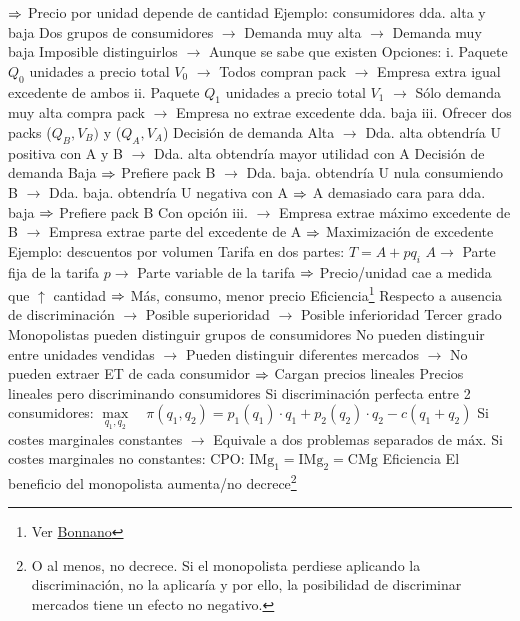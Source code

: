 \documentclass{nuevotema}
\begin{document}
\begin{esquemal}
				\4[] $\Rightarrow$ Precio por unidad depende de cantidad
				\4 Ejemplo: consumidores dda. alta y baja
				\4[] Dos grupos de consumidores
				\4[] $\to$ Demanda muy alta
				\4[] $\to$ Demanda muy baja
				\4[] Imposible distinguirlos
				\4[] $\to$ Aunque se sabe que existen
				\4[] Opciones:
				\4[] i. Paquete $Q_0$ unidades a precio total $V_0$
				\4[] $\to$ Todos compran pack
				\4[] $\to$ Empresa extra igual excedente de ambos
				\4[] ii. Paquete $Q_1$ unidades a precio total $V_1$
				\4[] $\to$ Sólo demanda muy alta compra pack
				\4[] $\to$ Empresa no extrae excedente dda. baja
				\4[] iii. Ofrecer dos packs ($Q_B, V_B)$ y ($Q_A, V_A$)
				\4[] Decisión de demanda Alta
				\4[] $\to$ Dda. alta obtendría U positiva con A y B
				\4[] $\to$ Dda. alta obtendría mayor utilidad con A
				\4[] Decisión de demanda Baja
				\4[] $\Rightarrow$ Prefiere pack B
				\4[] $\to$ Dda. baja. obtendría U nula consumiendo B
				\4[] $\to$ Dda. baja. obtendría U negativa con A
				\4[] $\Rightarrow$ A demasiado cara para dda. baja
				\4[] $\Rightarrow$ Prefiere pack B
				\4[] Con opción iii.
				\4[] $\to$ Empresa extrae máximo excedente de B
				\4[] $\to$ Empresa extrae parte del excedente de A
				\4[] $\Rightarrow$ Maximización de excedente
				\4 Ejemplo: descuentos por volumen
				\4[] Tarifa en dos partes:
				\4[] $T = A + p q_i$
				\4[] $A \to$ Parte fija de la tarifa
				\4[] $p \to$ Parte variable de la tarifa
				\4[] $\Rightarrow$ Precio/unidad cae a medida que $\uparrow$ cantidad
				\4[] $\Rightarrow$ Más, consumo, menor precio
				\4 Eficiencia\footnote{Ver \href{http://faculty.econ.ucdavis.edu/faculty/bonanno/teaching/200C/2nd_degree.pdf}{Bonnano}}
				\4[] Respecto a ausencia de discriminación
				\4[] $\to$ Posible superioridad
				\4[] $\to$ Posible inferioridad
			\3 Tercer grado
				\4 Monopolistas pueden distinguir grupos de consumidores
				\4[] No pueden distinguir entre unidades vendidas
				\4[] $\to$ Pueden distinguir diferentes mercados
				\4[] $\to$ No pueden extraer ET de cada consumidor
				\4[] $\Rightarrow$ Cargan precios lineales
				\4 Precios lineales pero discriminando consumidores
				\4 Si discriminación perfecta entre 2 consumidores:
				\4[] $\underset{q_1,q_2}{\max} \quad \pi(q_1,q_2) = p_1(q_1) \cdot q_1 + p_2(q_2) \cdot q_2 - c(q_1+q_2)$
				\4 Si costes marginales constantes
				\4[] $\to$ Equivale a dos problemas separados de máx.
				\4 Si costes marginales no constantes:
				\4[] CPO: $\text{IMg}_1 = \text{IMg}_2 = \text{CMg}$
				\4 Eficiencia
				\4[] El beneficio del monopolista aumenta/no decrece\footnote{O al menos, no decrece. Si el monopolista perdiese aplicando la discriminación, no la aplicaría y por ello, la posibilidad de discriminar mercados tiene un efecto no negativo.}

\end{esquemal}
\end{document}
